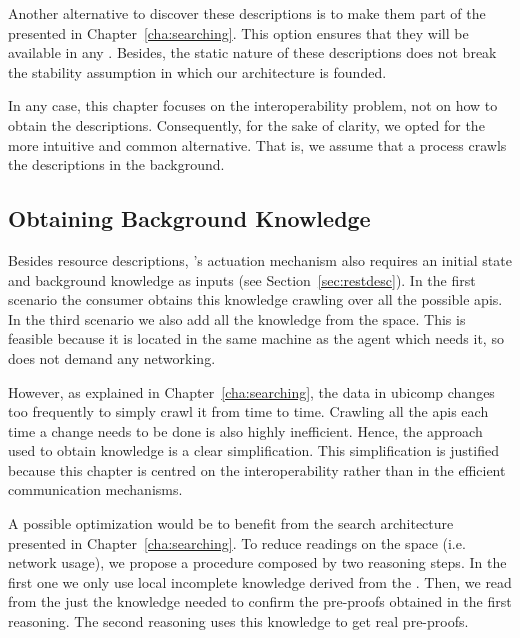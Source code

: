 Another alternative to discover these descriptions is to make them part of the \clues{} presented in Chapter~\ref{cha:searching}.
This option ensures that they will be available in any \consumer{}.
Besides, the static nature of these descriptions does not break the \clues{} stability assumption in which our architecture is founded. %


In any case, this chapter focuses on the interoperability problem, not on how to obtain the descriptions.
Consequently, for the sake of clarity, we opted for the more intuitive and common alternative. %
That is, we assume that a process crawls the descriptions in the background.



\subsection{Obtaining Background Knowledge}

Besides resource descriptions, \citeauthor{verborgh_ijcs_2014}'s actuation mechanism also requires an initial state and background knowledge as inputs (see Section~\ref{sec:restdesc}).
In the first scenario the consumer obtains this knowledge crawling over all the possible \acsp{api}.
In the third scenario we also add all the knowledge from the space.
This is feasible because it is located in the same machine as the agent which needs it, so does not demand any networking. %


However, as explained in Chapter~\ref{cha:searching}, the data in \ac{ubicomp} changes too frequently to simply crawl it from time to time.
Crawling all the \acsp{api} each time a change needs to be done is also highly inefficient.
Hence, the approach used to obtain knowledge is a clear simplification.
This simplification is justified because this chapter is centred on the interoperability rather than in the efficient communication mechanisms.


\bigskip


A possible optimization would be to benefit from the search architecture presented in Chapter~\ref{cha:searching}.
To reduce readings on the space (i.e. network usage), we propose a procedure composed by two reasoning steps.
In the first one we only use local incomplete knowledge derived from the \clues{}.
Then, we read from the \Space{} just the knowledge needed to confirm the pre-proofs obtained in the first reasoning.
The second reasoning uses this knowledge to get real pre-proofs. %


